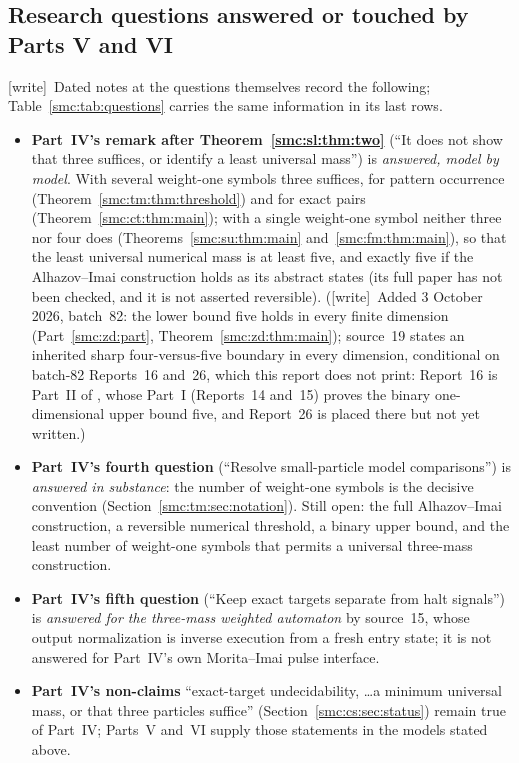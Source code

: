 \documentclass[11pt,letterpaper]{article}
\numberwithin{equation}{section}
\theoremstyle{definition}
\theoremstyle{remark}
\newcommand{\wtag}{\textup{[write]}}
\begin{document}
\subsection{Research questions answered or touched by Parts V and VI}\label{smc:tm:sec:frontquestions}

\wtag\ Dated notes at the questions themselves record the following; Table~\ref{smc:tab:questions} carries the same information in its last rows.
\begin{itemize}
\item \textbf{Part~IV's remark after Theorem~\ref{smc:sl:thm:two}} (``It does not show that three suffices, or identify a least universal mass'') is \emph{answered, model by model}. With several weight-one symbols three suffices, for pattern occurrence (Theorem~\ref{smc:tm:thm:threshold}) and for exact pairs (Theorem~\ref{smc:ct:thm:main}); with a single weight-one symbol neither three nor four does (Theorems~\ref{smc:su:thm:main} and~\ref{smc:fm:thm:main}), so that the least universal numerical mass is at least five, and exactly five if the Alhazov--Imai construction holds as its abstract states (its full paper has not been checked, and it is not asserted reversible). (\wtag\ Added 3 October 2026, batch~82: the lower bound five holds in every finite dimension (Part~\ref{smc:zd:part}, Theorem~\ref{smc:zd:thm:main}); source~19 states an inherited sharp four-versus-five boundary in every dimension, conditional on batch-82 Reports~16 and~26, which this report does not print: Report~16 is Part~II of , whose Part~I (Reports~14 and~15) proves the binary one-dimensional upper bound five, and Report~26 is placed there but not yet written.)
\item \textbf{Part~IV's fourth question} (``Resolve small-particle model comparisons'') is \emph{answered in substance}: the number of weight-one symbols is the decisive convention (Section~\ref{smc:tm:sec:notation}). Still open: the full Alhazov--Imai construction, a reversible numerical threshold, a binary upper bound, and the least number of weight-one symbols that permits a universal three-mass construction.
\item \textbf{Part~IV's fifth question} (``Keep exact targets separate from halt signals'') is \emph{answered for the three-mass weighted automaton} by source~15, whose output normalization is inverse execution from a fresh entry state; it is not answered for Part~IV's own Morita--Imai pulse interface.
\item \textbf{Part~IV's non-claims} ``exact-target undecidability, \ldots a minimum universal mass, or that three particles suffice'' (Section~\ref{smc:cs:sec:status}) remain true of Part~IV; Parts~V and~VI supply those statements in the models stated above.

\end{itemize}
\end{document}
